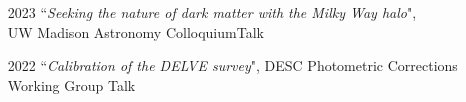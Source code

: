 \documentclass[11pt,letterpaper, sans]{moderncv}        %
\begin{document}
\begin{itemize}[itemsep=1pt, leftmargin=28pt]
    \item [2023] ``\textit{Seeking the nature of dark matter with the Milky Way halo}", \\
    UW Madison Astronomy Colloquium\hfill Talk
    \item [2022] ``\textit{Calibration of the DELVE survey}", DESC Photometric Corrections Working Group \hfill Talk
\end{itemize}
\end{document}

